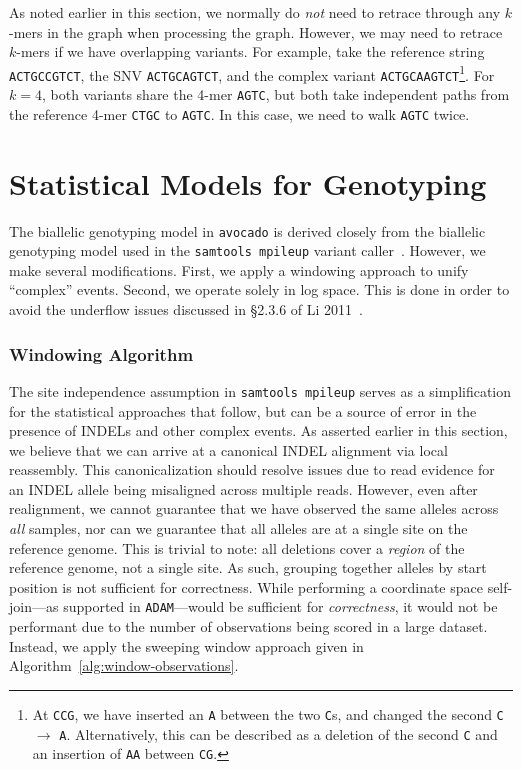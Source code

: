 \documentclass[masters]{ucbthesis}
\begin{document}
As noted earlier in this section, we normally do \emph{not} need to retrace through any $k$-mers in the
graph when processing the graph. However, we may need to retrace $k$-mers if we have overlapping
variants. For example, take the reference string \texttt{ACTGCCGTCT}, the SNV \texttt{ACTGCAGTCT},
and the complex variant \texttt{ACTGCAAGTCT}\footnote{At \texttt{CCG}, we have inserted an \texttt{A}
between the two \texttt{C}s, and changed the second \texttt{C} $\rightarrow$ \texttt{A}. Alternatively, this
can be described as a deletion of the second \texttt{C} and an insertion of \texttt{AA} between
\texttt{CG}.}. For $k = 4$, both variants share the 4-mer \texttt{AGTC}, but both take independent paths
from the reference 4-mer \texttt{CTGC} to \texttt{AGTC}. In this case, we need to walk \texttt{AGTC} twice.

\section{Statistical Models for Genotyping}
\label{sec:statistical-genotyping}

The biallelic genotyping model in \texttt{avocado} is derived closely from the biallelic genotyping model used in the
\texttt{samtools mpileup} variant caller~\cite{li11snp}. However, we make several modifications. First, we apply
a windowing approach to unify ``complex'' events. Second, we operate solely in log space. This is done in order to
avoid the underflow issues discussed in \S2.3.6 of Li 2011~\cite{li11snp}.

\subsubsection{Windowing Algorithm}
\label{sec:windowing}

The site independence assumption in \texttt{samtools mpileup} serves as a simplification for the statistical approaches
that follow, but can be a source of error in the presence of INDELs and other complex events. As asserted earlier in
this section, we believe that we can arrive at a canonical INDEL alignment via local reassembly. This canonicalization
should resolve issues due to read evidence for an INDEL allele being misaligned across multiple reads. However,
even after realignment, we cannot guarantee that we have observed the same alleles across \emph{all} samples, nor
can we guarantee that all alleles are at a single site on the reference genome. This is trivial to note: all deletions cover
a \emph{region} of the reference genome, not a single site. As such, grouping together alleles by start position is not
sufficient for correctness. While performing a coordinate space self-join---as supported in \texttt{ADAM}---would be
sufficient for \emph{correctness}, it would not be performant due to the number of observations being scored in a large
dataset. Instead, we apply the sweeping window approach given in Algorithm~\ref{alg:window-observations}.
\end{document}

